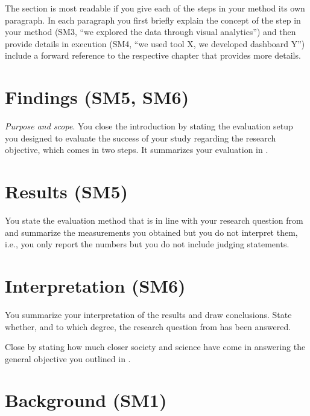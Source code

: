 The section is most readable if you give each of the steps in your method its own paragraph.
In each paragraph you first briefly explain the concept of the step in your method (SM3, ``we explored the data through visual analytics'') and then provide details in execution (SM4, ``we used tool X, we developed dashboard Y'') include a forward reference to the respective chapter that provides more details.

\section{Findings (SM5, SM6)}\label{sec:introduction:results}

\emph{Purpose and scope}.
You close the introduction by stating the evaluation setup you designed to evaluate the success of your study regarding the research objective, which comes in two steps.
It summarizes your evaluation in .

\section*{Results (SM5)}

You state the evaluation method that is in line with your research question from  and summarize the measurements you obtained but you do not interpret them, i.e., you only report the numbers but you do not include judging statements.

\section*{Interpretation (SM6)}

You summarize your interpretation of the results and draw conclusions.
State whether, and to which degree, the research question from  has been answered.

Close by stating how much closer society and science have come in answering the general objective you outlined in .

\section{Background (SM1)}\label{sec:background}

